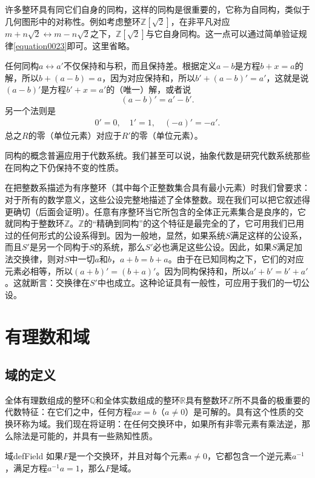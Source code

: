 许多整环具有同它们自身的同构，这样的同构是很重要的，它称为自同构，类似于几何图形中的对称性。例如考虑整环$\mathbb{Z}[\sqrt{2}]$，在非平凡对应$m+n\sqrt{2} \leftrightarrow m-n\sqrt{2}$之下，$\mathbb{Z}[\sqrt{2}]$与它自身同构。这一点可以通过简单验证规律\ref{equation0023}即可。这里省略。

任何同构$a \leftrightarrow a'$不仅保持和与积，而且保持差。根据定义$a-b$是方程$b+x=a$的解，所以$b + (a-b) = a$，因为对应保持和，所以$b'+(a-b)'=a'$，这就是说$(a-b)'$是方程$b'+x=a'$的（唯一）解，或者说
\[
(a-b)' = a'-b'.
\]
另一个法则是
\begin{gather}\label{equation0024}
0'=0,\quad 1'=1, \quad (-a)'=-a'.
\end{gather}
总之$R$的零（单位元素）对应于$R'$的零（单位元素）。

同构的概念普遍应用于代数系统。我们甚至可以说，抽象代数是研究代数系统那些在同构之下仍保持不变的性质。

在把整数系描述为有序整环（其中每个正整数集合具有最小元素）时我们曾要求：对于所有的数学意义，这些公设完整地描述了全体整数。现在我们可以把它叙述得更确切（后面会证明）。任意有序整环当它所包含的全体正元素集合是良序的，它就同构于整数环$\mathbb{Z}$。$\mathbb{Z}$的“精确到同构”的这个特征是最完全的了，它可用我们已用过的任何形式的公设系得到。因为一般地，显然，如果系统$S$满足这样的公设系，而且$S'$是另一个同构于$S$的系统，那么$S'$必也满足这些公设。因此，如果$S$满足加法交换律，则对$S$中一切$a$和$b$，$a+b=b+a$。由于在已知同构之下，它们的对应元素必相等，所以$(a+b)'= (b+a)'$。因为同构保持和，所以$a'+b'= b'+a'$。这就断言：交换律在$S'$中也成立。这种论证具有一般性，可应用于我们的一切公设。

\chapter{有理数和域}
\section{域的定义}
全体有理数组成的整环$\mathbb{Q}$和全体实数组成的整环$\mathbb{R}$具有整数环$\mathbb{Z}$所不具备的极重要的代数特征：在它们之中，任何方程$ax=b$（$a \neq 0$）是可解的。具有这个性质的交换环称为域。我们现在将证明：在任何交换环中，如果所有非零元素有乘法逆，那么除法是可能的，并具有一些熟知性质。
\begin{definition}{域}{defField}
如果$F$是一个交换环，并且对每个元素$a \neq 0$，它都包含一个逆元素$a^{-1}$，满足方程$a^{-1}a=1$，那么$F$是域。
\end{definition}

